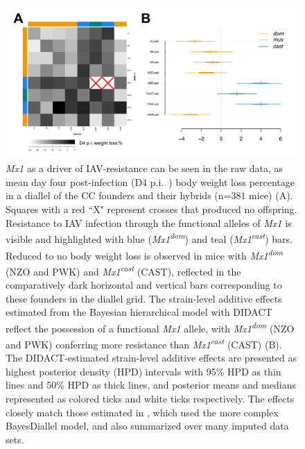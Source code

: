 \begin{figure}
\renewcommand{\familydefault}{\sfdefault}\normalfont
\centering
\includegraphics[width=\textwidth, trim={0in 0in 0in 0in}, clip]{figures/2-didact/flu_data_and_effects.pdf}
\caption[Response to Influenza A infection in diallel and its strain-level effects]{\textit{Mx1} as a driver of IAV-resistance can be seen in the raw data, as mean day four post-infection (D4 p.i.\ ) body weight loss percentage in a diallel of the CC founders and their hybrids (n=381 mice) (A).  Squares with a red ``X" represent crosses that produced no offspring. Resistance to IAV infection through the functional alleles of \textit{Mx1} is visible and highlighted with blue (\textit{Mx1}\textsuperscript{\textit{dom}}) and teal (\textit{Mx1}\textsuperscript{\textit{cast}}) bars. Reduced to no body weight loss is observed in mice with \textit{Mx1}\textsuperscript{\textit{dom}} (NZO and PWK) and \textit{Mx1}\textsuperscript{\textit{cast}} (CAST), reflected in the comparatively dark horizontal and vertical bars corresponding to these founders in the diallel grid. The strain-level additive effects estimated from the Bayesian hierarchical model with DIDACT reflect the possession of a functional \textit{Mx1} allele, with \textit{Mx1}\textsuperscript{\textit{dom}} (NZO and PWK) conferring more resistance than \textit{Mx1}\textsuperscript{\textit{cast}} (CAST) (B). The DIDACT-estimated strain-level additive effects are presented as highest posterior density (HPD) intervals with 95\% HPD as thin lines and 50\% HPD as thick lines, and posterior means and medians represented as colored ticks and white ticks respectively. The effects closely match those estimated in \cite{Maurizio2017}, which used the more complex BayesDiallel model, and also summarized over many imputed data sets.\label{fig:flu_data_effects}}
\end{figure}

